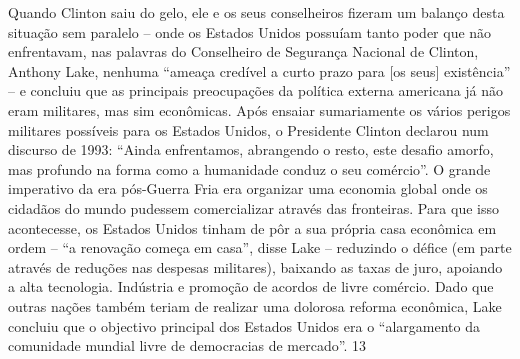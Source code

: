 Quando Clinton saiu do gelo, ele e os seus conselheiros fizeram um balanço desta situação sem paralelo – onde os Estados Unidos possuíam tanto poder que não enfrentavam, nas palavras do Conselheiro de Segurança Nacional de Clinton, Anthony Lake, nenhuma “ameaça credível a curto prazo para [os seus] existência” – e concluiu que as principais preocupações da política externa americana já não eram militares, mas sim econômicas. Após ensaiar sumariamente os vários perigos militares possíveis para os Estados Unidos, o Presidente Clinton declarou num discurso de 1993: “Ainda enfrentamos, abrangendo o resto, este desafio amorfo, mas profundo na forma como a humanidade conduz o seu comércio”. O grande imperativo da era pós-Guerra Fria era organizar uma economia global onde os cidadãos do mundo pudessem comercializar através das fronteiras. Para que isso acontecesse, os Estados Unidos tinham de pôr a sua própria casa econômica em ordem – “a renovação começa em casa”, disse Lake – reduzindo o défice (em parte através de reduções nas despesas militares), baixando as taxas de juro, apoiando a alta tecnologia. Indústria e promoção de acordos de livre comércio. Dado que outras nações também teriam de realizar uma dolorosa reforma econômica, Lake concluiu que o objectivo principal dos Estados Unidos era o “alargamento da comunidade mundial livre de democracias de mercado”.
 {\color{blue} 13}  

 
\par
 
